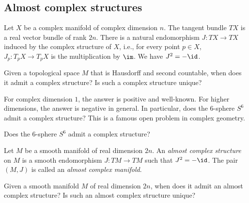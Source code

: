 

\subsection{Almost complex structures}

Let \(X\) be a complex manifold of complex dimension \(n\).
The tangent bundle \(TX\) is a real vector bundle of rank \(2n\).
There is a natural endomorphism \(J: TX\to TX\) induced by the complex structure of \(X\), i.e., for every point \(p\in X\), \(J_p: T_pX\to T_pX\) is the multiplication by \(\im\).
We have \(J^2 = -\id\).

\begin{question}\label{qs:existence-and-uniqueness-of-complex-structure}
	Given a topological space \(M\) that is Hausdorff and second countable, when does it admit a complex structure?
	Is such a complex structure unique?
\end{question}

For complex dimension \(1\), the answer is positive and well-known.
For higher dimensions, the answer is negative in general.
In particular, does the \(6\)-sphere \(S^6\) admit a complex structure?
This is a famous open problem in complex geometry.

\begin{question}\label{qs:complex_structure_on_S6}
	Does the \(6\)-sphere \(S^6\) admit a complex structure?
\end{question}

\begin{definition}\label{def:almost_complex_structure}
	Let \(M\) be a smooth manifold of real dimension \(2n\).
	An \emph{almost complex structure} on \(M\) is a smooth endomorphism \(J: TM\to TM\) such that \(J^2 = -\id\).
	The pair \((M,J)\) is called an \emph{almost complex manifold}.
\end{definition}


\begin{question}\label{qs:existence_of_almost_complex_structure}
	Given a smooth manifold \(M\) of real dimension \(2n\), when does it admit an almost complex structure?
	Is such an almost complex structure unique?
\end{question}

